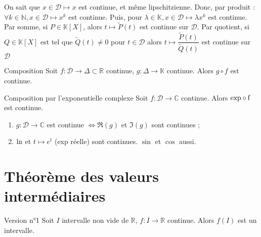 \documentclass[12pt,a4paper]{report}
\begin{document}
\begin{exemple}{}
On sait que $x \in \mathcal{D} \mapsto x$ est continue, et même lipschitzienne. Donc, par produit : \newline $\forall k \in \mathbb{N}, x \in \mathcal{D} \mapsto x^k$ est continue. \newline Puis, pour $\lambda \in \mathbb{K}, x \in \mathcal{D} \mapsto \lambda x^k$ est continue.
\newline Par somme, si $P \in \mathbb{K}\left[X\right]$, alors $t \mapsto \widetilde{P}(t)$ est continue sur $\mathcal{D}$.
\newline Par quotient, si $Q \in \mathbb{K}\left[X\right]$ est tel que $\widetilde{Q}(t) \neq 0$ pour $t \in \mathcal{D}$ alors  $t \mapsto \dfrac{\widetilde{P}(t)}{\widetilde{Q}(t)}$ est continue sur $\mathcal{D}$
\end{exemple}

\begin{theoreme}{Composition}{}
Soit $f : \mathcal{D} \rightarrow \Delta \subset \mathbb{R}$ continue, \newline $g : \Delta \rightarrow \mathbb{K}$ continue.
\newline Alors $g \circ f$ est continue.

\end{theoreme}

\begin{principedemo}{}

\end{principedemo}

\begin{proposition}{Composition par l'exponentielle complexe}{}
Soit $f : \mathcal{D} \rightarrow \mathbb{C}$ continue. Alors $\rm{exp} \circ f$ est continue.
\end{proposition}

\begin{remarque}
\begin{enumerate}
\item $g : \mathcal{D} \rightarrow \mathbb{C}$ est continue $\Longleftrightarrow \Re(g)$ et $\Im(g)$ sont continues ;
\item $\rm{ln}$ et $t \mapsto e^t$ (exp réelle) sont continues. $\sin$ et $\cos$ aussi.
\end{enumerate}
\end{remarque}

\section{Théorème des valeurs intermédiaires}
\begin{theoreme}{Version n°1}{}
Soit $I$ intervalle non vide de $\mathbb{R}$, $f:I\longrightarrow\mathbb{R}$
continue. Alors $f\left(I\right)$ est un intervalle.
\end{theoreme}
\end{document}
